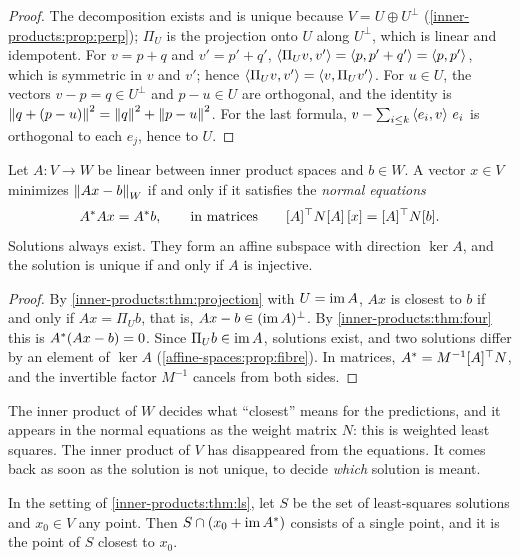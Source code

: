 \begin{notechapter}
\begin{proof}
The decomposition exists and is unique because $V = U\oplus U^\perp$
(\cref{inner-products:prop:perp}); $\Pi_U$ is the projection onto $U$
along $U^\perp$, which is linear and idempotent. For $v = p + q$ and
$v' = p' + q'$, $\left\langle \Pi_Uv, v' \right\rangle = \left\langle p, p' + q' \right\rangle = \left\langle p, p' \right\rangle$,
which is symmetric in $v$ and $v'$; hence
$\left\langle \Pi_Uv, v' \right\rangle = \left\langle v, \Pi_Uv' \right\rangle$. For $u\in U$, the vectors
$v - p = q\in U^\perp$ and $p - u\in U$ are orthogonal, and the identity is
$\left\|q + (p - u)\right\|^2 = \left\|q\right\|^2 + \left\|p - u\right\|^2$. For the last formula,
$v - \sum_{i\leq k}\left\langle e_i, v \right\rangle\,e_i$ is orthogonal to each $e_j$, hence to
$U$.
\end{proof}

\begin{theorem}\label{inner-products:thm:ls}
Let $A:V\to W$ be linear between inner product spaces and $b\in W$. A
vector $x\in V$ minimizes $\left\|Ax - b\right\|_W$ if and only if it satisfies the
\emph{normal equations}
\[
  A^{*}Ax = A^{*}b ,
  \qquad\text{in matrices}\qquad
  [A]^\top N[A]\,[x] = [A]^\top N[b] .
\]
Solutions always exist. They form an affine subspace with direction
$\ker A$, and the solution is unique if and only if $A$ is injective.
\end{theorem}

\begin{proof}
By \cref{inner-products:thm:projection} with $U = \operatorname{im} A$, $Ax$ is closest
to $b$ if and only if $Ax = \Pi_Ub$, that is, $Ax - b\in(\operatorname{im} A)^\perp$. By
\cref{inner-products:thm:four} this is $A^{*}(Ax - b) = 0$. Since
$\Pi_Ub\in\operatorname{im} A$, solutions exist, and two solutions differ by an element
of $\ker A$ (\cref{affine-spaces:prop:fibre}). In matrices,
$A^{*} = M^{-1}[A]^\top N$, and the invertible factor $M^{-1}$ cancels
from both sides.
\end{proof}

\begin{intuition}
The inner product of $W$ decides what ``closest'' means for the
predictions, and it appears in the normal equations as the weight matrix
$N$: this is weighted least squares. The inner product of $V$ has
disappeared from the equations. It comes back as soon as the solution is
not unique, to decide \emph{which} solution is meant.
\end{intuition}

\begin{theorem}\label{inner-products:thm:min-norm}
In the setting of \cref{inner-products:thm:ls}, let $S$ be the set of
least-squares solutions and $x_0\in V$ any point. Then
$S\cap(x_0 + \operatorname{im}A^{*})$ consists of a single point, and it is the point
of $S$ closest to $x_0$.
\end{theorem}


\end{notechapter}
